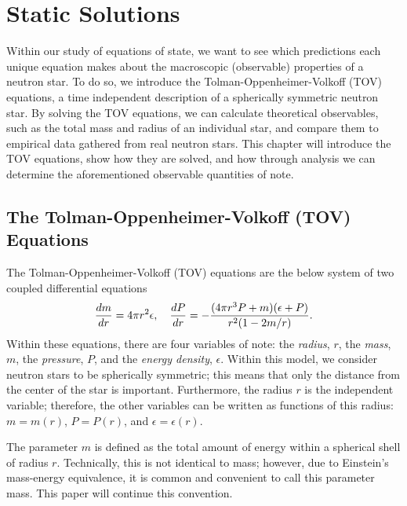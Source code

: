 \chapter{Static Solutions}\label{ch: static solutions}

Within our study of equations of state, we want to see which predictions each unique equation makes about the macroscopic (observable) properties of a neutron star. To do so, we introduce the Tolman-Oppenheimer-Volkoff (TOV) equations, a time independent description of a spherically symmetric neutron star. By solving the TOV equations, we can calculate theoretical observables, such as the total mass and radius of an individual star, and compare them to empirical data gathered from real neutron stars. This chapter will introduce the TOV equations, show how they are solved, and how through analysis we can determine the aforementioned observable quantities of note.

\section{The Tolman-Oppenheimer-Volkoff (TOV) Equations}

The Tolman-Oppenheimer-Volkoff (TOV) equations are the below system of two coupled differential equations
\begin{align}\label{eqn: tov}
    \dv{m}{r} = 4\pi r^2 \epsilon, \quad \dv{P}{r} = -\frac{(4\pi r^3 P + m)(\epsilon + P)}{r^2 (1-2m/r)}.
\end{align}
Within these equations, there are four variables of note: the \textit{radius}, $r$, the \textit{mass}, $m$, the \textit{pressure}, $P$, and the \textit{energy density}, $\epsilon$. Within this model, we consider neutron stars to be spherically symmetric; this means that only the distance from the center of the star is important. Furthermore, the radius $r$ is the independent variable; therefore, the other variables can be written as functions of this radius: $m=m(r)$, $P=P(r)$, and $\epsilon=\epsilon(r)$.

The parameter $m$ is defined as the total amount of energy within a spherical shell of radius $r$. Technically, this is not identical to mass; however, due to Einstein's mass-energy equivalence, it is common and convenient to call this parameter mass. This paper will continue this convention. 

